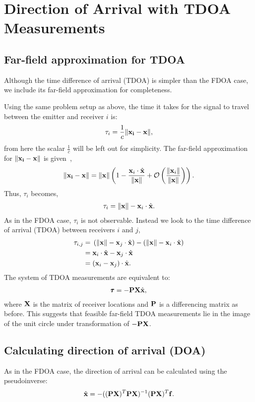 \section{Direction of Arrival with TDOA Measurements}
\label{s:TDOA}
\subsection{Far-field approximation for TDOA}
Although the time difference of arrival (TDOA) is simpler than the FDOA case, we include its far-field approximation for completeness.

Using the same problem setup as above, the time it takes for the signal to travel between the emitter and receiver $i$ is:
\begin{align*}
  \tau_{i} = \frac{1}{c}\|\mathbf{x_i}-\mathbf{x}\|,
\end{align*}
from here the scalar $\frac{1}{c}$ will be left out for simplicity.
The far-field approximation for $\|\mathbf{x_i}-\mathbf{x}\|$ is given~\cite{Cheney2009},
\begin{align*}
  \|\mathbf{x_i}-\mathbf{x}\|=\|\mathbf{x}\|\left(1-\frac{\mathbf{x}_i\cdot\hat{\mathbf{x}}}{\|\mathbf{x}\|}+\mathcal{O}\left( \frac{\|\mathbf{x}_i\|}{\|\mathbf{x}\|}\right) \right).
\end{align*}
Thus, $\tau_{i}$ becomes,
\begin{align*}
  \tau_{i} = \|\mathbf{x}\| - \mathbf{x}_i\cdot\hat{\mathbf{x}}.
\end{align*}
As in the FDOA case, $\tau_i$ is not observable. Instead we look to the time difference of arrival (TDOA) between receivers $i$ and $j$,
\begin{align*}
  \tau_{i,j} =& \; \left(\|\mathbf{x}\| - \mathbf{x}_j\cdot\hat{\mathbf{x}}\right) - \left(\|\mathbf{x}\| - \mathbf{x}_i\cdot\hat{\mathbf{x}}\right) \\
            =& \; \mathbf{x}_i\cdot\hat{\mathbf{x}} - \mathbf{x}_j\cdot\hat{\mathbf{x}} \\
            =& \; (\mathbf{x}_i-\mathbf{x}_j)\cdot\hat{\mathbf{x}}.
\end{align*}
The system of TDOA measurements are equivalent to:
\begin{align}
  \pmb{\tau} = -\mathbf{PX}\hat{\mathbf{x}},
\end{align}
where $\mathbf{X}$ is the matrix of receiver locations and $\mathbf{P}$ is a differencing matrix as before. This suggests that feasible far-field TDOA measurements lie in the image of the unit circle under transformation of $-\mathbf{PX}$.

\subsection{Calculating direction of arrival (DOA)}
As in the FDOA case, the direction of arrival can be calculated using the pseudoinverse:
\begin{align}
    \label{eq:doa_t}
  \hat{\mathbf{x}} = -((\mathbf{PX})^T\mathbf{PX})^{-1}(\mathbf{PX})^T\mathbf{f}.
\end{align}
